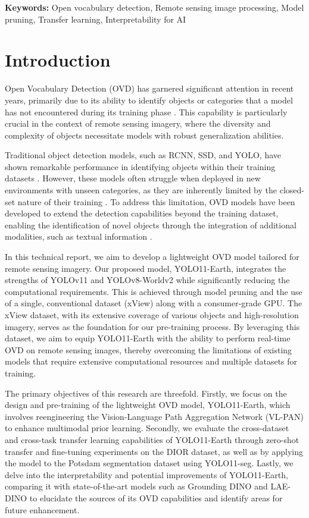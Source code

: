 \documentclass{article}
\begin{document}
\textbf{Keywords:} Open vocabulary detection, Remote sensing image processing, Model pruning, Transfer learning, Interpretability for AI

\section{Introduction}
Open Vocabulary Detection (OVD) has garnered significant attention in recent years, 
primarily due to its ability to identify objects or categories that a model has not 
encountered during its training phase \cite{zareian2021open, scheirer2012toward}. 
This capability is particularly crucial in the context of remote sensing imagery, 
where the diversity and complexity of objects necessitate models with robust 
generalization abilities. 

Traditional object detection models, such as RCNN, SSD, and YOLO, have shown remarkable 
performance in identifying objects within their training datasets \cite{girshick2014rich,liu2016ssd,redmon2016you}. 
However, these models often struggle when deployed in new environments with unseen 
categories, as they are inherently limited by the closed-set nature of their training \cite{akyon2022slicing,wu2022uiu,yang2022querydet}. 
To address this limitation, OVD models have been developed to extend the detection 
capabilities beyond the training dataset, enabling the identification of novel objects 
through the integration of additional modalities, such as textual information \cite{cheng2024yolo,liu2024grounding,ren2024grounding}. 

In this technical report, we aim to develop a lightweight OVD model tailored for remote sensing imagery. 
Our proposed model, YOLO11-Earth, integrates the strengths of YOLOv11 and YOLOv8-Worldv2 
while significantly reducing the computational requirements. 
This is achieved through model pruning and the use of a single, conventional dataset 
(xView) along with a consumer-grade GPU. 
The xView dataset, with its extensive coverage of various objects and high-resolution imagery, 
serves as the foundation for our pre-training process. 
By leveraging this dataset, we aim to equip YOLO11-Earth with the ability to perform 
real-time OVD on remote sensing images, thereby overcoming the limitations of existing 
models that require extensive computational resources and multiple datasets for training. 

The primary objectives of this research are threefold. 
Firstly, we focus on the design and pre-training of the lightweight OVD model, YOLO11-Earth, 
which involves reengineering the Vision-Language Path Aggregation Network (VL-PAN) to 
enhance multimodal prior learning. 
Secondly, we evaluate the cross-dataset and cross-task transfer learning capabilities 
of YOLO11-Earth through zero-shot transfer and fine-tuning experiments on the DIOR dataset, 
as well as by applying the model to the Potsdam segmentation dataset using YOLO11-seg. 
Lastly, we delve into the interpretability and potential improvements of YOLO11-Earth, 
comparing it with state-of-the-art models such as Grounding DINO and LAE-DINO to elucidate 
the sources of its OVD capabilities and identify areas for future enhancement. 
\end{document}
